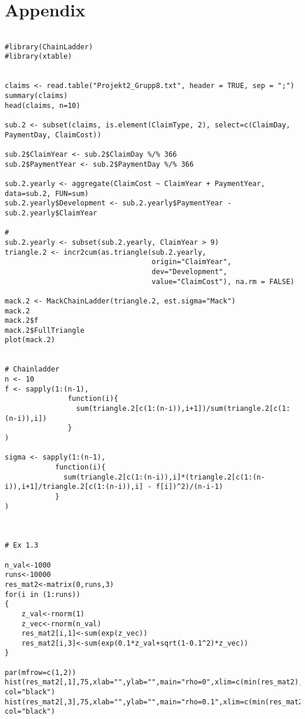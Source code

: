 \documentclass[11pt]{article}
\begin{document}
\section*{Appendix}

\begin{verbatim}

#library(ChainLadder)
#library(xtable)


claims <- read.table("Projekt2_Grupp8.txt", header = TRUE, sep = ";")
summary(claims)
head(claims, n=10)

sub.2 <- subset(claims, is.element(ClaimType, 2), select=c(ClaimDay, PaymentDay, ClaimCost))

sub.2$ClaimYear <- sub.2$ClaimDay %/% 366
sub.2$PaymentYear <- sub.2$PaymentDay %/% 366

sub.2.yearly <- aggregate(ClaimCost ~ ClaimYear + PaymentYear, data=sub.2, FUN=sum)
sub.2.yearly$Development <- sub.2.yearly$PaymentYear - sub.2.yearly$ClaimYear

#
sub.2.yearly <- subset(sub.2.yearly, ClaimYear > 9)
triangle.2 <- incr2cum(as.triangle(sub.2.yearly,
                                   origin="ClaimYear",
                                   dev="Development",
                                   value="ClaimCost"), na.rm = FALSE)

mack.2 <- MackChainLadder(triangle.2, est.sigma="Mack")
mack.2
mack.2$f
mack.2$FullTriangle
plot(mack.2)


# Chainladder
n <- 10
f <- sapply(1:(n-1),
               function(i){
                 sum(triangle.2[c(1:(n-i)),i+1])/sum(triangle.2[c(1:(n-i)),i])
               }
)

sigma <- sapply(1:(n-1),
            function(i){
              sum(triangle.2[c(1:(n-i)),i]*(triangle.2[c(1:(n-i)),i+1]/triangle.2[c(1:(n-i)),i] - f[i])^2)/(n-i-1)
            }
)



# Ex 1.3

n_val<-1000
runs<-10000
res_mat2<-matrix(0,runs,3)
for(i in (1:runs))
{
	z_val<-rnorm(1)
	z_vec<-rnorm(n_val)
	res_mat2[i,1]<-sum(exp(z_vec))
	res_mat2[i,3]<-sum(exp(0.1*z_val+sqrt(1-0.1^2)*z_vec))
}

par(mfrow=c(1,2))
hist(res_mat2[,1],75,xlab="",ylab="",main="rho=0",xlim=c(min(res_mat2),max(res_mat2)),
col="black")
hist(res_mat2[,3],75,xlab="",ylab="",main="rho=0.1",xlim=c(min(res_mat2),max(res_mat2)),
col="black")
\end{verbatim}
\end{document}
